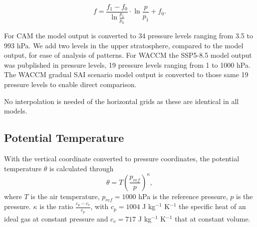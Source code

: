 \begin{equation}
    f = \frac{f_1 - f_0}{\ln\frac{p_1}{p_0}} \cdot \ln \frac{p}{p_1} + f_0.
\end{equation}

For CAM the model output is converted to 34 pressure levels ranging from 3.5 to 993 hPa. We add two levels in the upper stratosphere, compared to the model output, for ease of analysis of patterns. For WACCM the SSP5-8.5 model output was pubplished in pressure levels, 19 pressure levels ranging from 1 to 1000 hPa. The WACCM gradual SAI scenario model output is converted to those same 19 pressure levels to enable direct comparison.

No interpolation is needed of the horizontal grids as these are identical in all models. 


\subsection{Potential Temperature}
With the vertical coordinate converted to pressure coordinates, the potential temperature $\theta$ is calculated through
\begin{equation}
    \theta = T\left( \frac{p_{ref}}{p} \right)^\kappa, 
\end{equation}
where $T$ is the air temperature, $p_{ref} = 1000$ hPa is the reference pressure, $p$ is the pressure. $\kappa$ is the ratio $\frac{c_p - c_v}{c_p}$, with $c_p = 1004$ J kg$^{-1}$ K$^{-1}$ the specific heat of an ideal gas at constant pressure and $c_v = 717$ J kg$^{-1}$ K$^{-1}$ that at constant volume. 
